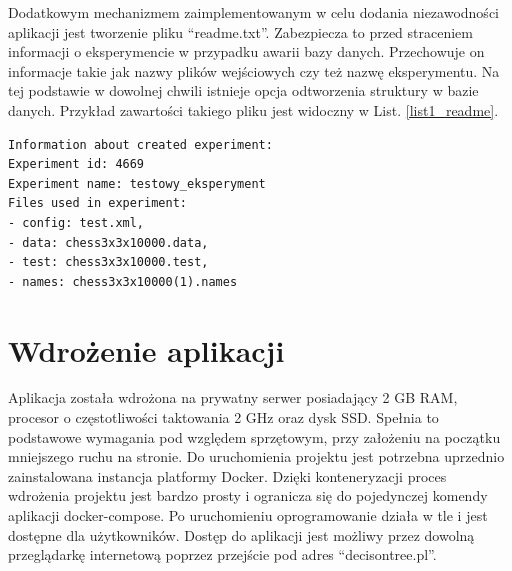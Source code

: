 Dodatkowym mechanizmem zaimplementowanym w celu dodania niezawodności aplikacji jest tworzenie pliku \enquote{readme.txt}. Zabezpiecza to przed straceniem informacji o eksperymencie w przypadku awarii bazy danych. Przechowuje on informacje takie jak nazwy plików wejściowych czy też nazwę eksperymentu. Na tej podstawie w dowolnej chwili istnieje opcja odtworzenia struktury w bazie danych. Przykład zawartości takiego pliku jest widoczny w List. \ref{list1_readme}.

\begin{lstlisting}[numbers=none,frame=single, caption={Przykład zawartości pliku readme },captionpos=b, label=list1_readme]
Information about created experiment: 
Experiment id: 4669
Experiment name: testowy_eksperyment
Files used in experiment: 
- config: test.xml,
- data: chess3x3x10000.data, 
- test: chess3x3x10000.test, 
- names: chess3x3x10000(1).names
\end{lstlisting}


\section{Wdrożenie aplikacji}
Aplikacja została wdrożona na prywatny serwer posiadający 2 GB RAM, procesor o częstotliwości taktowania 2 GHz oraz dysk SSD. Spełnia to podstawowe wymagania pod względem sprzętowym, przy założeniu na początku mniejszego ruchu na stronie. Do uruchomienia projektu jest potrzebna uprzednio zainstalowana instancja platformy Docker. Dzięki konteneryzacji proces wdrożenia projektu jest bardzo prosty i ogranicza się do pojedynczej komendy aplikacji docker-compose. Po uruchomieniu oprogramowanie działa w tle i jest dostępne dla użytkowników. Dostęp do aplikacji jest możliwy przez dowolną przeglądarkę internetową poprzez przejście pod adres \enquote{decisontree.pl}. 
